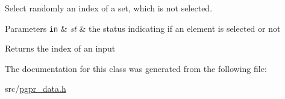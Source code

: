 Select randomly an index of a set, which is not selected. 


\begin{DoxyParams}[1]{Parameters}
\mbox{\tt in}  & {\em st} & the status indicating if an element is selected or not \\
\hline
\end{DoxyParams}
\begin{DoxyReturn}{Returns}
the index of an input 
\end{DoxyReturn}


The documentation for this class was generated from the following file\-:\begin{DoxyCompactItemize}
\item 
src/\hyperlink{pgpr__data_8h}{pgpr\-\_\-data.\-h}\end{DoxyCompactItemize}
